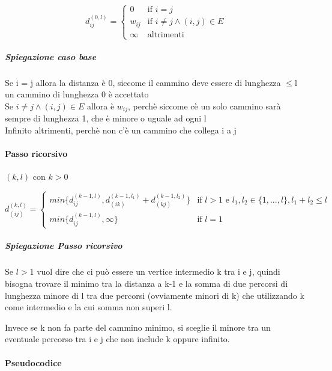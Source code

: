 \begin{equation*}
	d^{(0,l)}_{ij}= \begin{cases}
		0      & \text{if $i = j$}                      \\
		w_{ij} & \text{if $i \neq j \land (i,j) \in E$} \\
		\infty & \text{altrimenti}
	\end{cases}
\end{equation*}

\subparagraph{Spiegazione caso base}
Se i = j allora la distanza è 0, siccome il cammino deve essere di lunghezza $\leq$l un cammino di lunghezza 0 è accettato
\\Se $i \neq j \land (i,j) \in E$ allora è $w_{ij}$, perchè siccome cè un solo cammino sarà sempre di lunghezza 1, che è minore o uguale ad ogni l
\\Infinito altrimenti, perchè non c'è un cammino che collega i a j

\paragraph{Passo ricorsivo} $(k,l)$ con $k>0$

\begin{equation*}
	d^{(k,l)}_{(ij)} = \begin{cases}
		min\{d^{(k-1,l)}_{ij}, d^{(k-1,l_1)}_{(ik)} + d^{(k-1,l_2)}_{(kj)}  \} & \text{if $l > 1$ e $l_1,l_2\in\{1,...,l\}, l_1+l_2\leq l$ } \\
		min\{d^{(k-1,l)}_{ij}, \infty \}                                       & \text{if $l = 1$}
	\end{cases}
\end{equation*}

\subparagraph*{Spiegazione Passo ricorsivo}
Se $l > 1$ vuol dire che ci può essere un vertice intermedio k tra i e j, quindi bisogna trovare il minimo tra
la distanza a k-1 e la somma di due percorsi di lunghezza minore di l tra due percorsi (ovviamente minori di k) che utilizzando k come intermedio e la
cui somma non superi l.

Invece se k non fa parte del cammino minimo, si sceglie il minore tra un eventuale percorso tra i e j che non include k oppure infinito.

\paragraph{Pseudocodice}

